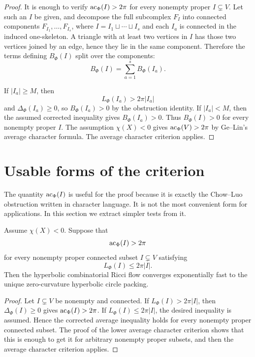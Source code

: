 \begin{proof}
It is enough to verify $\operatorname{ac}_\Phi(I)>2\pi$ for every nonempty proper
$I\subsetneq V$.  Let such an $I$ be given, and decompose the full
subcomplex $F_I$ into connected components $F_{I_1},\dots,F_{I_s}$, where
$I=I_1\sqcup\cdots\sqcup I_s$ and each $I_a$ is connected in the induced
one-skeleton.  A triangle with at least two vertices in $I$ has those two
vertices joined by an edge, hence they lie in the same component.  Therefore
the terms defining $B_\Phi(I)$ split over the components:
\[
  B_\Phi(I)=\sum_{a=1}^s B_\Phi(I_a).
\]

If $|I_a|\ge M$, then
\[
  L_\Phi(I_a)>2\pi |I_a|
\]
and $\Delta_\Phi(I_a)\ge0$, so $B_\Phi(I_a)>0$ by the obstruction identity.
If $|I_a|<M$, then the assumed corrected inequality gives
$B_\Phi(I_a)>0$.  Thus $B_\Phi(I)>0$ for every nonempty proper $I$.
The assumption $\chi(X)<0$ gives $\operatorname{ac}_\Phi(V)>2\pi$ by Ge--Lin's average
character formula.  The average character criterion applies.
\end{proof}

\section{Usable forms of the criterion}

The quantity $\operatorname{ac}_\Phi(I)$ is useful for the proof because it is exactly
the Chow--Luo obstruction written in character language.  It is not the
most convenient form for applications.  In this section we extract simpler
tests from it.

\begin{corollary}\label{cor:only-potentially-bad-subsets}
\leanok
Assume $\chi(X)<0$.  Suppose that
\[
  \operatorname{ac}_\Phi(I)>2\pi
\]
for every nonempty proper connected subset $I\subsetneq V$ satisfying
\[
  L_\Phi(I)\le 2\pi |I|.
\]
Then the hyperbolic combinatorial Ricci flow converges exponentially fast
to the unique zero-curvature hyperbolic circle packing.
\end{corollary}

\begin{proof}
Let $I\subsetneq V$ be nonempty and connected.  If
$L_\Phi(I)>2\pi |I|$, then $\Delta_\Phi(I)\ge0$ gives
$\operatorname{ac}_\Phi(I)>2\pi$.  If $L_\Phi(I)\le2\pi |I|$, the desired inequality is
assumed.  Hence the corrected average inequality holds for every nonempty
proper connected subset.  The proof of the lower average character
criterion shows that this is enough to get it for arbitrary nonempty proper
subsets, and then the average character criterion applies.
\end{proof}

